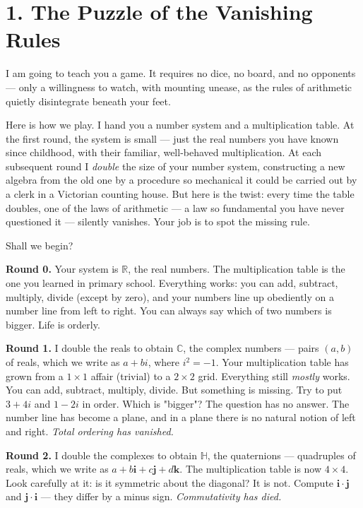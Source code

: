 \documentclass[12pt, letterpaper, openany]{book}
\theoremstyle{definition}
\theoremstyle{remark}
\begin{document}
\section*{1. The Puzzle of the Vanishing Rules}


I am going to teach you a game. It requires no dice, no board, and no opponents --- only a willingness to watch, with mounting unease, as the rules of arithmetic quietly disintegrate beneath your feet.

Here is how we play. I hand you a number system and a multiplication table. At the first round, the system is small --- just the real numbers you have known since childhood, with their familiar, well-behaved multiplication. At each subsequent round I \textit{double} the size of your number system, constructing a new algebra from the old one by a procedure so mechanical it could be carried out by a clerk in a Victorian counting house. But here is the twist: every time the table doubles, one of the laws of arithmetic --- a law so fundamental you have never questioned it --- silently vanishes. Your job is to spot the missing rule.

Shall we begin?

\textbf{Round 0.} Your system is $\mathbb{R}$, the real numbers. The multiplication table is the one you learned in primary school. Everything works: you can add, subtract, multiply, divide (except by zero), and your numbers line up obediently on a number line from left to right. You can always say which of two numbers is bigger. Life is orderly.

\textbf{Round 1.} I double the reals to obtain $\mathbb{C}$, the complex numbers --- pairs $(a, b)$ of reals, which we write as $a + bi$, where $i^2 = -1$. Your multiplication table has grown from a $1 \times 1$ affair (trivial) to a $2 \times 2$ grid. Everything still \textit{mostly} works. You can add, subtract, multiply, divide. But something is missing. Try to put $3 + 4i$ and $1 - 2i$ in order. Which is "bigger"? The question has no answer. The number line has become a plane, and in a plane there is no natural notion of left and right. \textit{Total ordering has vanished.}

\textbf{Round 2.} I double the complexes to obtain $\mathbb{H}$, the quaternions --- quadruples of reals, which we write as $a + b\mathbf{i} + c\mathbf{j} + d\mathbf{k}$. The multiplication table is now $4 \times 4$. Look carefully at it: is it symmetric about the diagonal? It is not. Compute $\mathbf{i} \cdot \mathbf{j}$ and $\mathbf{j} \cdot \mathbf{i}$ --- they differ by a minus sign. \textit{Commutativity has died.}
\end{document}
